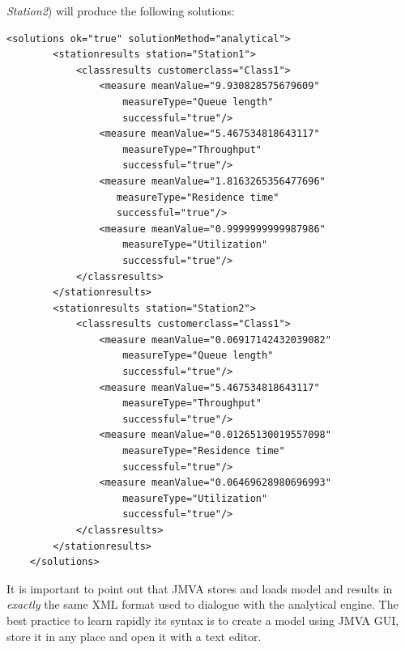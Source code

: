 \emph{Station2}) will produce the following solutions:
\begin{lstlisting}[gobble=3]
    <solutions ok="true" solutionMethod="analytical">
        <stationresults station="Station1">
            <classresults customerclass="Class1">
                <measure meanValue="9.930828575679609"
                    measureType="Queue length"
                    successful="true"/>
                <measure meanValue="5.467534818643117"
                    measureType="Throughput"
                    successful="true"/>
                <measure meanValue="1.8163265356477696"
                   measureType="Residence time"
                   successful="true"/>
                <measure meanValue="0.9999999999987986"
                    measureType="Utilization"
                    successful="true"/>
            </classresults>
        </stationresults>
        <stationresults station="Station2">
            <classresults customerclass="Class1">
                <measure meanValue="0.06917142432039082"
                    measureType="Queue length"
                    successful="true"/>
                <measure meanValue="5.467534818643117"
                    measureType="Throughput"
                    successful="true"/>
                <measure meanValue="0.01265130019557098"
                    measureType="Residence time"
                    successful="true"/>
                <measure meanValue="0.06469628980696993"
                    measureType="Utilization"
                    successful="true"/>
            </classresults>
        </stationresults>
    </solutions>
\end{lstlisting}

It is important to point out that JMVA stores and loads model and
results in \emph{exactly} the same XML format used to dialogue with
the analytical engine. The best practice to learn rapidly its syntax
is to create a model using JMVA GUI, store it in any place and open
it with a text editor.
